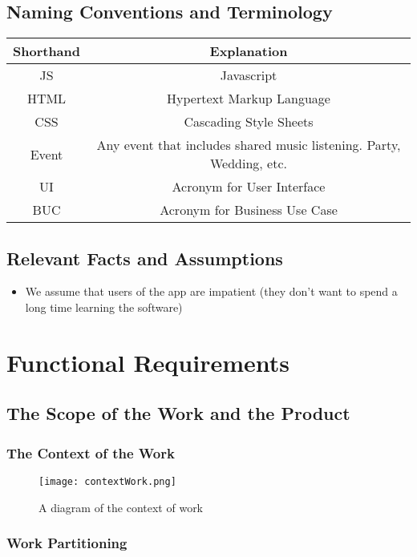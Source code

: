 \documentclass[12pt, titlepage]{article}
\begin{document}
\subsection{Naming Conventions and Terminology}

\begin{table}[H]
\centering
\begin{tabular}{ c | c }
\textbf{Shorthand} & \textbf{Explanation}\\ \hline
JS & Javascript\\
HTML & Hypertext Markup Language\\
CSS & Cascading Style Sheets\\
Event & Any event that includes shared music listening. Party, Wedding, etc. \\
UI & Acronym for User Interface\\
BUC & Acronym for Business Use Case
\end{tabular}
\end{table}
\subsection{Relevant Facts and Assumptions}

\begin{itemize}
\item We assume that users of the app are impatient (they don't want to spend a
long time learning the software)
\end{itemize}

\section{Functional Requirements}

\subsection{The Scope of the Work and the Product}

\subsubsection{The Context of the Work}
\begin{figure}[!ht]
  \caption{A diagram of the context of work}
  \centering
    \texttt{[image: contextWork.png]}
\end{figure}
\subsubsection{Work Partitioning}
\end{document}
